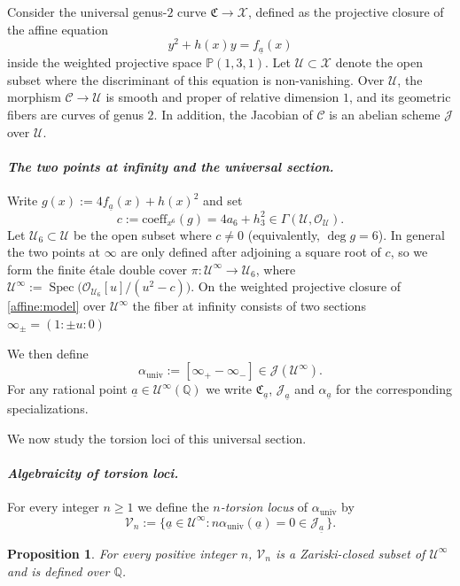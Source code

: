 \documentclass{amsart}
\newcommand{\Q}{{\mathbb Q}}
\newcommand{\cJ}{\mathcal{J}}
\newcommand{\cV}{\mathcal{V}}
\newcommand{\cU}{\mathcal{U}}
\newcommand{\Cu}{\mathfrak{C}}
\newcommand{\ua}{\underline{a}}
\DeclareMathOperator{\Spec}{\mathrm{Spec}}
\newtheorem{proposition}{Proposition}[section]
\begin{document}
Consider the universal genus-$2$ curve $\Cu \to \mathcal X$,
defined as the projective closure of the affine equation
\begin{equation} \label{affine:model} 
y^2 + h(x)y = f_{\ua}(x) 
\end{equation}
inside the weighted projective space $\mathbb P(1,3,1)$.
 Let $\mathcal U \subset \mathcal X$ denote the open subset where the discriminant of this equation is non-vanishing. Over \(\mathcal U\), the morphism
\(\mathcal C \to \mathcal U\) is smooth and proper of relative dimension \(1\),
and its geometric fibers are curves of genus \(2\). In addition, the Jacobian of
\(\mathcal C\) is an abelian scheme \(\mathcal J\) over \(\mathcal U\).


\medskip

\paragraph{\emph{The two points at infinity and the universal section.}}
Write $g(x):=4f_{\ua}(x)+h(x)^2$ and set
\[
  c:=\mathrm{coeff}_{x^6}(g)=4a_6+h_3^2 \in \Gamma(\cU,\mathcal O_{\cU}).
\]
Let $\cU_6\subset \cU$ be the open subset where $c\neq 0$ (equivalently, $\deg g=6$).
In general the two points at $\infty$ are only defined after adjoining a square root of $c$,
so we form the finite étale double cover
  $\pi:\cU^\infty \longrightarrow \cU_6$,
where $\cU^{\infty}:= \Spec\bigl(\mathcal O_{\cU_6}[u]/(u^2-c)\bigr)$.
On the weighted projective closure of \eqref{affine:model} over $\cU^\infty$ the fiber at infinity
consists of two sections $\infty_\pm=(1:\pm u:0)$

We then define
\[
  \alpha_{\mathrm{univ}} := [\infty_+ - \infty_-] \in \mathcal J(\cU^{\infty}).
\]
For any rational point $\ua \in \cU^\infty(\Q)$ we write $\Cu_{\ua}$, $\cJ_{\ua}$ and $\alpha_{\ua}$ for the corresponding
specializations.


We now study the torsion loci of this universal section.

\medskip

\paragraph{\emph{Algebraicity of torsion loci.}}

For every integer $n\ge 1$ we define the \emph{$n$-torsion locus} of $\alpha_{\mathrm{univ}}$ by
\[
  \cV_n := \{ \ua \in \cU^\infty : n\alpha_{\mathrm{univ}}(\ua )=0\in \cJ_{\ua}\,\}.
\]

\begin{proposition}\label{prop:algebraic-booker}
For every positive integer $n$, $\cV_n$ is a Zariski-closed subset of $\cU^\infty$ and is defined over $\Q$.
\end{proposition}
\end{document}
